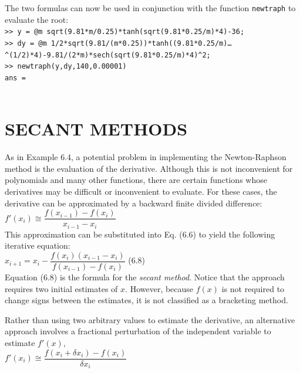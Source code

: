 \documentclass[../main.tex]{subfiles}
\begin{document}
\begin{example}
    The two formulas can now be used in conjunction with the function \texttt{newtraph} to
    evaluate the root:\\

    \texttt{>> y = @m sqrt(9.81*m/0.25)*tanh(sqrt(9.81*0.25/m)*4)-36;\\
    \indent >> dy = @m 1/2*sqrt(9.81/(m*0.25))*tanh((9.81*0.25/m)\ldots\\
    \indent\indent \textasciicircum(1/2)*4)-9.81/(2*m)*sech(sqrt(9.81*0.25/m)*4)\textasciicircum2;\\
    \indent >> newtraph(y,dy,140,0.00001)\\
    \indent ans =\\
    \indent{}\\}
\end{example}
\bigskip

\section[SECANT METHODS]{SECANT METHODS}
\noindent As in Example 6.4, a potential problem in implementing the Newton-Raphson method is
the evaluation of the derivative. Although this is not inconvenient for polynomials and
many other functions, there are certain functions whose derivatives may be difficult or
inconvenient to evaluate. For these cases, the derivative can be approximated by a backward
finite divided difference:\\

$f'(x_i)\cong \dfrac{f(x_{i-1})-f(x_i)}{x_{i-1}-x_i}$\\

\noindent This approximation can be substituted into Eq. (6.6) to yield the following iterative
equation:\\

$x_{i+1} = x_i - \dfrac{f(x_i)(x_{i-1}-x_i)}{f(x_{i-1})-f(x_i)}$
\hfill (6.8)\\

Equation (6.8) is the formula for the \emph{secant method}. Notice that the approach requires two
initial estimates of $x$. However, because $f (x)$ is not required to change signs between the
estimates, it is not classified as a bracketing method.

Rather than using two arbitrary values to estimate the derivative, an alternative approach
involves a fractional perturbation of the independent variable to estimate $f'(x)$,\\

$f'(x_i)\cong \dfrac{f(x_i+\delta x_i)-f(x_i)}{\delta x_i}$\\
\end{document}
